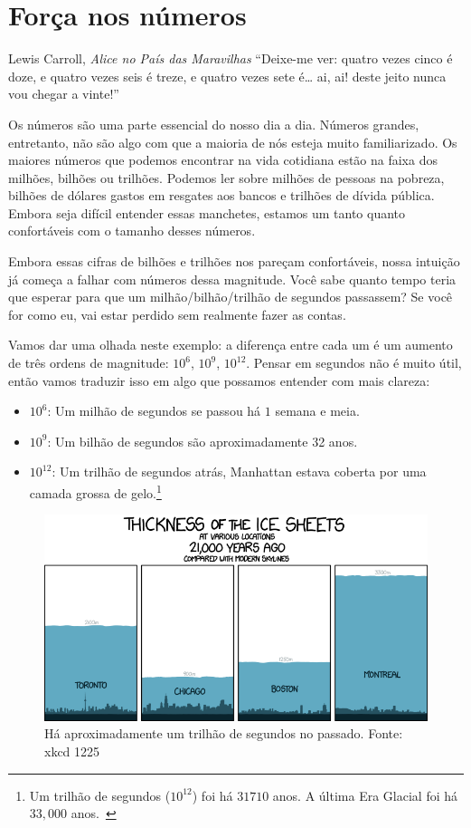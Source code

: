\chapter{Força nos números}
\label{les:15}

\begin{chapquote}{Lewis Carroll, \textit{Alice no País das Maravilhas}}
\enquote{Deixe-me ver: quatro vezes cinco é doze, e quatro vezes seis é treze, e quatro vezes sete é… ai, ai! deste jeito nunca vou chegar a vinte!}
\end{chapquote}

Os números são uma parte essencial do nosso dia a dia. Números grandes, entretanto, não são algo com que a maioria de nós esteja muito familiarizado. Os maiores números que podemos encontrar na vida cotidiana estão na faixa dos milhões, bilhões ou trilhões. Podemos ler sobre milhões de pessoas na pobreza, bilhões de dólares gastos em resgates aos bancos e trilhões de dívida pública. Embora seja difícil entender essas manchetes, estamos um tanto quanto confortáveis com o tamanho desses números.

Embora essas cifras de bilhões e trilhões nos pareçam confortáveis, nossa intuição já começa a falhar com números dessa magnitude. Você sabe quanto tempo teria que esperar para que um milhão/bilhão/trilhão de segundos passassem? Se você for como eu, vai estar perdido sem realmente fazer as contas.

Vamos dar uma olhada neste exemplo: a diferença entre cada um é um aumento de três ordens de magnitude: $10^6$, $10^9$, $10^{12}$. Pensar em segundos não é muito útil, então vamos traduzir isso em algo que possamos entender com mais clareza:

\begin{itemize}
  \item $10^6$: Um milhão de segundos se passou há $1$ semana e meia.
  \item $10^9$: Um bilhão de segundos são aproximadamente 32 anos.
  \item $10^{12}$: Um trilhão de segundos atrás, Manhattan estava coberta por uma camada grossa de gelo.\footnote{Um trilhão de segundos ($10^{12}$) foi há $31710$ anos. A última Era Glacial foi há $33,000$ anos.~\cite{wiki:LGM}}
\end{itemize}

\begin{figure}
  \includegraphics{assets/images/xkcd-1225.png}
  \caption{Há aproximadamente um trilhão de segundos no passado. Fonte: xkcd 1225}
  \label{fig:xkcd-1225}
\end{figure}

